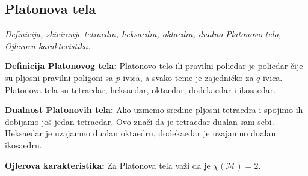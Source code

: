 \documentclass[12pt]{article}
\begin{document}
\subsection{Platonova tela}
\textit{Definicija, skiciranje tetraedra, heksaedra, oktaedra, dualno Platonovo
    telo, Ojlerova karakteristika.}

\textbf{Definicija Platonovog tela:} Platonovo telo ili pravilni poliedar je
poliedar čije su pljosni pravilni poligoni sa $p$ ivica, a svako teme je
zajedničko za $q$ ivica. Platonova tela su tetraedar, heksaedar, oktaedar,
dodekaedar i ikosaedar.
\par

\textbf{Dualnost Platonovih tela:} Ako uzmemo sredine pljosni tetraedra i
spojimo ih dobijamo još jedan tetraedar. Ovo znači da je tetraedar dualan sam
sebi. Heksaedar je uzajamno dualan oktaedru, dodekaedar je uzajamno dualan
ikosaedru.
\par

\textbf{Ojlerova karakteristika:} Za Platonova tela važi da je
$\chi(\mathcal{M})=2$.

\newpage
\nocite{*}
\raggedright


\end{document}

